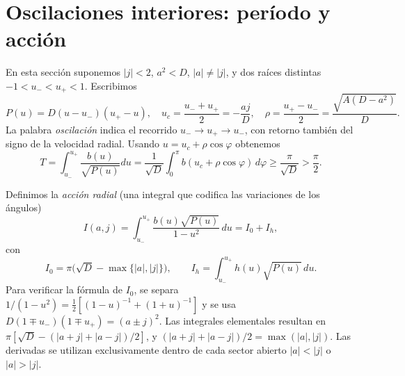 \documentclass[11pt,a4paper]{article}
\theoremstyle{remark}\newtheorem{remark}[theorem]{Observación}
\begin{document}
\section{Oscilaciones interiores: período y acción}
En esta sección suponemos $|j|<2$, $a^2<D$, $|a|\ne|j|$, y dos raíces distintas $-1<u_-<u_+<1$. Escribimos
\begin{equation}\label{eq:turning}
P(u)=D(u-u_-)(u_+-u),\quad u_c=\frac{u_-+u_+}{2}=-\frac{aj}{D},\quad \rho=\frac{u_+-u_-}{2}=\frac{\sqrt{A(D-a^2)}}{D}.
\end{equation}
La palabra \emph{oscilación} indica el recorrido $u_-\to u_+\to u_-$, con retorno también del signo de la velocidad radial. Usando $u=u_c+\rho\cos\varphi$ obtenemos
\begin{equation}\label{eq:period}
T=\int_{u_-}^{u_+}\frac{b(u)}{\sqrt{P(u)}}du
=\frac1{\sqrt D}\int_0^\pi b(u_c+\rho\cos\varphi)\,d\varphi
\geq\frac\pi{\sqrt D}>\frac\pi2.
\end{equation}

Definimos la \emph{acción radial} (una integral que codifica las variaciones de los ángulos)
\begin{equation}\label{eq:action}
I(a,j)=\int_{u_-}^{u_+}\frac{b(u)\sqrt{P(u)}}{1-u^2}\,du=I_0+I_h,
\end{equation}
con
\begin{equation}\label{eq:actionparts}
I_0=\pi\bigl(\sqrt D-\max\{|a|,|j|\}\bigr),\qquad
I_h=\int_{u_-}^{u_+}h(u)\sqrt{P(u)}\,du.
\end{equation}
Para verificar la fórmula de $I_0$, se separa $1/(1-u^2)=\tfrac12[(1-u)^{-1}+(1+u)^{-1}]$ y se usa $D(1\mp u_-)(1\mp u_+)=(a\pm j)^2$. Las integrales elementales resultan en $\pi[\sqrt D-(|a+j|+|a-j|)/2]$, y $(|a+j|+|a-j|)/2=\max(|a|,|j|)$. Las derivadas se utilizan exclusivamente dentro de cada sector abierto $|a|<|j|$ o $|a|>|j|$.
\end{document}
